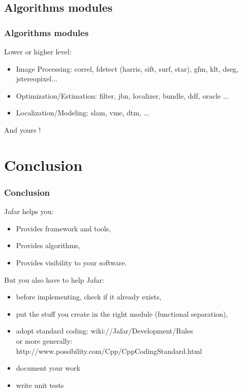 \documentclass[compress]{beamer}
\begin{document}
\subsection{Algorithms modules}

\begin{frame}
  \frametitle{Algorithms modules}
  Lower or higher level:
  \begin{itemize}
   \item Image Processing: correl, fdetect (harris, sift, surf, star), gfm, klt, dseg, jstereopixel...
   \item Optimization/Estimation: filter, jbn, localizer, bundle, ddf, oracle ...
   \item Localization/Modeling: slam, vme, dtm, ...
  \end{itemize}
  And yours !
\end{frame}


\section{Conclusion}

\begin{frame}
  \frametitle{Conclusion}
  Jafar helps you:
  \begin{itemize}
   \item<1-> Provides framework and tools,
   \item<2-> Provides algorithms,
   \item<3-> Provides visibility to your software.
  \end{itemize}
  But you also have to help Jafar:
  \begin{itemize}
		\item<4-> before implementing, check if it already exists,
		\item<5-> put the stuff you create in the right module (functional separation),
		\item<6-> adopt standard coding: wiki://Jafar/Development/Rules\\
or more generally: http://www.possibility.com/Cpp/CppCodingStandard.html
		\item<7-> document your work
		\item<8-> write unit tests
  \end{itemize}
\end{frame}
\end{document}
